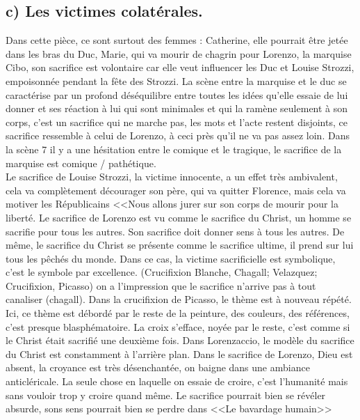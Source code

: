\documentclass[12pt]{article}
\begin{document}
\subsection*{c) Les victimes colatérales.}
Dans cette pièce, ce sont surtout des femmes : Catherine, elle pourrait être jetée dans les bras du Duc, Marie, qui va mourir de chagrin pour Lorenzo, la marquise Cibo, son sacrifice est volontaire car elle veut influencer les Duc et Louise Strozzi, empoisonnée pendant la fête des Strozzi.
La scène entre la marquise et le duc se caractérise par un profond déséquilibre entre toutes les idées qu'elle essaie de lui donner et ses réaction à lui qui sont minimales et qui la ramène seulement à son corps, c'est un sacrifice qui ne marche pas, les mots et l'acte restent disjoints, ce sacrifice ressemble à celui de Lorenzo, à ceci près qu'il ne va pas assez loin.
Dans la scène 7 il y a une hésitation entre le comique et le tragique, le sacrifice de la marquise est comique / pathétique.\\
Le sacrifice de Louise Strozzi, la victime innocente, a un effet très ambivalent, cela va complètement décourager son père, qui va quitter Florence, mais cela va motiver les Républicains <<Nous allons jurer sur son corps de mourir pour la liberté.
Le sacrifice de Lorenzo est vu comme le sacrifice du Christ, un homme se sacrifie pour tous les autres. Son sacrifice doit donner sens à tous les autres. De même, le sacrifice du Christ se présente comme le sacrifice ultime, il prend sur lui tous les pêchés du monde.
Dans ce cas, la victime sacrificielle est symbolique, c'est le symbole par excellence. (Crucifixion Blanche, Chagall; Velazquez; Crucifixion, Picasso) on a l'impression que le sacrifice n'arrive pas à tout canaliser (chagall). Dans la crucifixion de Picasso, le thème est à nouveau répété. Ici, ce thème est débordé par le reste de la peinture, des couleurs, des références, c'est presque blasphématoire.
La croix s'efface, noyée par le reste, c'est comme si le Christ était sacrifié une deuxième fois.
Dans Lorenzaccio, le modèle du sacrifice du Christ est constamment à l'arrière plan. Dans le sacrifice de Lorenzo, Dieu est absent, la croyance est très désenchantée, on baigne dans une ambiance anticléricale.
La seule chose en laquelle on essaie de croire, c'est l'humanité mais sans vouloir trop y croire quand même.
Le sacrifice pourrait bien se révéler absurde, sons sens pourrait bien se perdre dans <<Le bavardage humain>> 
\end{document}
